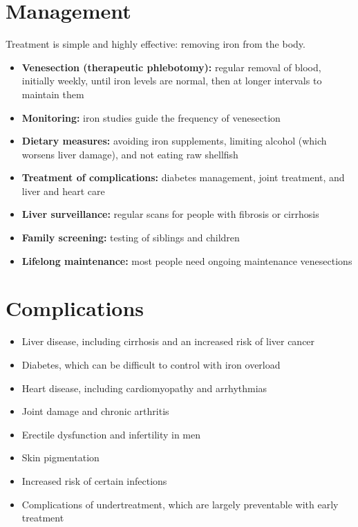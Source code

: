 \section*{Management}
Treatment is simple and highly effective: removing iron from the body.

\begin{itemize}
    \item \textbf{Venesection (therapeutic phlebotomy):} regular removal of blood, initially weekly, until iron levels are normal, then at longer intervals to maintain them
    \item \textbf{Monitoring:} iron studies guide the frequency of venesection
    \item \textbf{Dietary measures:} avoiding iron supplements, limiting alcohol (which worsens liver damage), and not eating raw shellfish
    \item \textbf{Treatment of complications:} diabetes management, joint treatment, and liver and heart care
    \item \textbf{Liver surveillance:} regular scans for people with fibrosis or cirrhosis
    \item \textbf{Family screening:} testing of siblings and children
    \item \textbf{Lifelong maintenance:} most people need ongoing maintenance venesections
\end{itemize}

\section*{Complications}
\begin{itemize}
    \item Liver disease, including cirrhosis and an increased risk of liver cancer
    \item Diabetes, which can be difficult to control with iron overload
    \item Heart disease, including cardiomyopathy and arrhythmias
    \item Joint damage and chronic arthritis
    \item Erectile dysfunction and infertility in men
    \item Skin pigmentation
    \item Increased risk of certain infections
    \item Complications of undertreatment, which are largely preventable with early treatment
\end{itemize}

